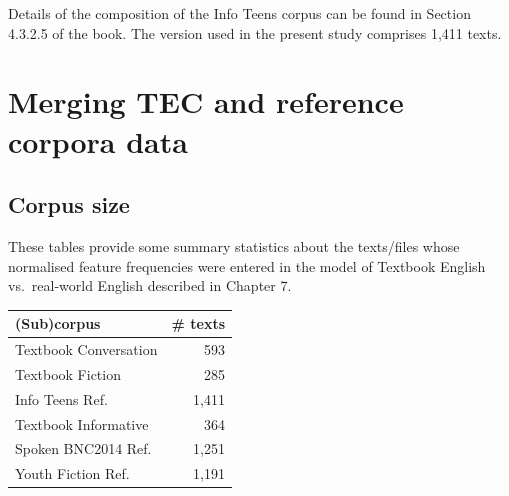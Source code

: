 \documentclass[
  letterpaper,
  DIV=11,
  numbers=noendperiod]{scrreprt}
\newenvironment{Shaded}{\begin{snugshade}}{\end{snugshade}}
\newcommand{\AttributeTok}[1]{\textcolor[rgb]{0.40,0.45,0.13}{#1}}
\newcommand{\FunctionTok}[1]{\textcolor[rgb]{0.28,0.35,0.67}{#1}}
\newcommand{\NormalTok}[1]{\textcolor[rgb]{0.00,0.23,0.31}{#1}}
\newcommand{\SpecialCharTok}[1]{\textcolor[rgb]{0.37,0.37,0.37}{#1}}
\newcommand{\StringTok}[1]{\textcolor[rgb]{0.13,0.47,0.30}{#1}}
\begin{document}
Details of the composition of the Info Teens corpus can be found in
Section 4.3.2.5 of the book. The version used in the present study
comprises 1,411 texts.

\section{Merging TEC and reference corpora
data}\label{merging-tec-and-reference-corpora-data}

\subsection{Corpus size}\label{corpus-size-1}

These tables provide some summary statistics about the texts/files whose
normalised feature frequencies were entered in the model of Textbook
English vs.~real-world English described in Chapter 7.

\begin{Shaded}
\end{Shaded}

\begin{longtable}[]{@{}lr@{}}
\toprule\noalign{}
(Sub)corpus & \# texts \\
\midrule\noalign{}
\endhead
\bottomrule\noalign{}
\endlastfoot
Textbook Conversation & 593 \\
Textbook Fiction & 285 \\
Info Teens Ref. & 1,411 \\
Textbook Informative & 364 \\
Spoken BNC2014 Ref. & 1,251 \\
Youth Fiction Ref. & 1,191 \\
\end{longtable}
\end{document}
